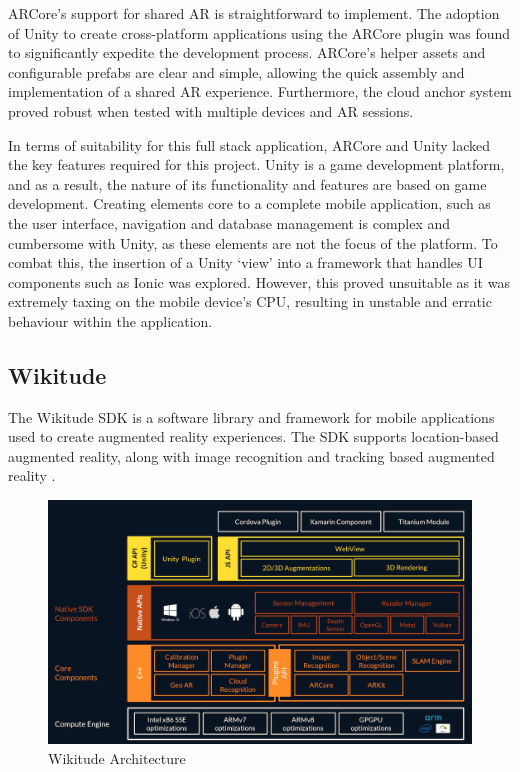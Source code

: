 ARCore’s support for shared AR is straightforward to implement. The adoption of Unity to create cross-platform applications using the ARCore plugin was found to significantly expedite the development process. ARCore’s helper assets and configurable prefabs are clear and simple, allowing the quick assembly and implementation of a shared AR experience.  
Furthermore, the cloud anchor system proved robust when tested with multiple devices and AR sessions. 

In terms of suitability for this full stack application, ARCore and Unity lacked the key features required for this project. Unity is a game development platform, and as a result, the nature of its functionality and features are based on game development. Creating elements core to a complete mobile application, such as the user interface, navigation and database management is complex and cumbersome with Unity, as these elements are not the focus of the platform. To combat this, the insertion of a Unity ‘view’ into a framework that handles UI components such as Ionic was explored. However, this proved unsuitable as it was extremely taxing on the mobile device’s CPU, resulting in unstable and erratic behaviour within the application. 


\subsection{Wikitude}
The Wikitude SDK is a software library and framework for mobile applications used to create augmented reality experiences. The SDK supports location-based augmented reality, along with image recognition and tracking based augmented reality \cite{wikitude_docs}.


\begin{figure}[!ht]
\caption{Wikitude Architecture \cite{wikitude_docs}}
\centering
\includegraphics[width=1\textwidth]{images/wikitude_architecture.png}
\end{figure}

